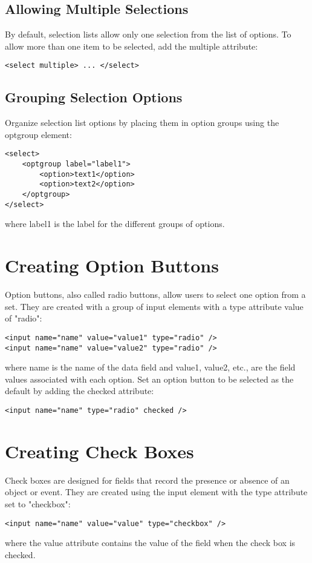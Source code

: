 \documentclass{article}
\begin{document}
\subsection{Allowing Multiple Selections}
By default, selection lists allow only one selection from the list of options. To allow more than one item to be selected, add the multiple attribute:
\begin{lstlisting}
<select multiple> ... </select>
\end{lstlisting}

\subsection{Grouping Selection Options}
Organize selection list options by placing them in option groups using the optgroup element:
\begin{lstlisting}
<select>
    <optgroup label="label1">
        <option>text1</option>
        <option>text2</option>
    </optgroup>
</select>
\end{lstlisting}
where label1 is the label for the different groups of options.

\section{Creating Option Buttons}
Option buttons, also called radio buttons, allow users to select one option from a set. They are created with a group of input elements with a type attribute value of "radio":
\begin{lstlisting}
<input name="name" value="value1" type="radio" />
<input name="name" value="value2" type="radio" />
\end{lstlisting}
where name is the name of the data field and value1, value2, etc., are the field values associated with each option. Set an option button to be selected as the default by adding the checked attribute:
\begin{lstlisting}
<input name="name" type="radio" checked />
\end{lstlisting}

\section{Creating Check Boxes}
Check boxes are designed for fields that record the presence or absence of an object or event. They are created using the input element with the type attribute set to "checkbox":
\begin{lstlisting}
<input name="name" value="value" type="checkbox" />
\end{lstlisting}
where the value attribute contains the value of the field when the check box is checked.
\end{document}
